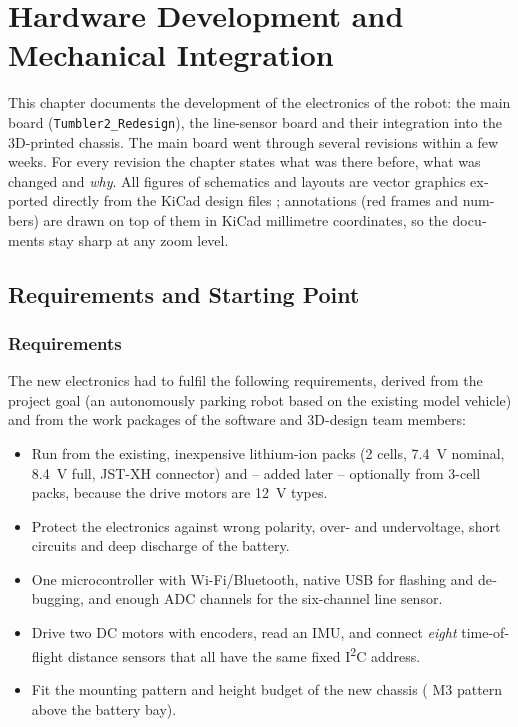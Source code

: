 \chapter{Hardware Development and Mechanical Integration}
\label{chap:hardware_cad}
\begin{otherlanguage}{english}

This chapter documents the development of the electronics of the robot: the main board
(\texttt{Tumbler2\_Redesign}), the line-sensor board and their integration into the 3D-printed
chassis. The main board went through several revisions within a few weeks. For every
revision the chapter states what was there before, what was changed and \emph{why}.
All figures of schematics and layouts are vector graphics exported directly from the KiCad
design files \cite{KiCad10}; annotations (red frames and numbers) are drawn on top of them
in KiCad millimetre coordinates, so the documents stay sharp at any zoom level.

\section{Requirements and Starting Point}
\label{sec:hw_requirements}

\subsection{Requirements}
The new electronics had to fulfil the following requirements, derived from the project goal
(an autonomously parking robot based on the existing model vehicle) and from the work
packages of the software and 3D-design team members:
\begin{itemize}
  \item Run from the existing, inexpensive lithium-ion packs (2 cells, \SI{7.4}{\volt} nominal,
        \SI{8.4}{\volt} full, JST-XH connector) and -- added later -- optionally from 3-cell packs,
        because the drive motors are \SI{12}{\volt} types.
  \item Protect the electronics against wrong polarity, over- and undervoltage, short circuits
        and deep discharge of the battery.
  \item One microcontroller with Wi-Fi/Bluetooth, native USB for flashing and debugging, and enough
        ADC channels for the six-channel line sensor.
  \item Drive two DC motors with encoders, read an IMU, and connect \emph{eight} time-of-flight
        distance sensors that all have the same fixed I\textsuperscript{2}C address.
  \item Fit the mounting pattern and height budget of the new chassis (
        M3 pattern above the battery bay).
\end{itemize}


\end{otherlanguage}
